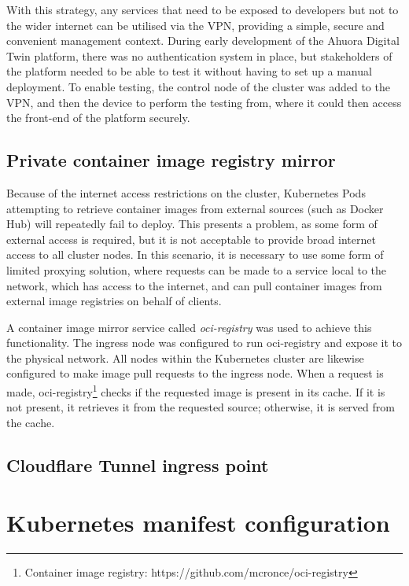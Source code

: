 With this strategy, any services that need to be exposed to developers but not to the wider internet can be utilised via the VPN, providing a simple, secure and convenient management context. During early development of the Ahuora Digital Twin platform, there was no authentication system in place, but stakeholders of the platform needed to be able to test it without having to set up a manual deployment. To enable testing, the control node of the cluster was added to the VPN, and then the device to perform the testing from, where it could then access the front-end of the platform securely.


\subsection{Private container image registry mirror}

Because of the internet access restrictions on the cluster, Kubernetes Pods attempting to retrieve container images from external sources (such as Docker Hub) will repeatedly fail to deploy. This presents a problem, as some form of external access is required, but it is not acceptable to provide broad internet access to all cluster nodes. In this scenario, it is necessary to use some form of limited proxying solution, where requests can be made to a service local to the network, which has access to the internet, and can pull container images from external image registries on behalf of clients.

A container image mirror service called \textit{oci-registry} was used to achieve this functionality. The ingress node was configured to run oci-registry  and expose it to the physical network. All nodes within the Kubernetes cluster are likewise configured to make image pull requests to the ingress node. When a request is made, oci-registry\footnote{Container image registry: https://github.com/mcronce/oci-registry} checks if the requested image is present in its cache. If it is not present, it retrieves it from the requested source; otherwise, it is served from the cache.

\subsection{Cloudflare Tunnel ingress point}

\section{Kubernetes manifest configuration}
